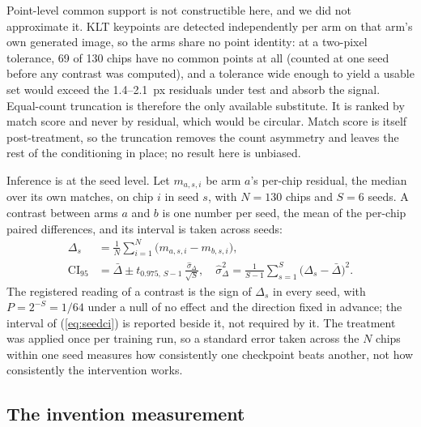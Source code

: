 Point-level common support is not constructible here, and we did not approximate it. KLT keypoints are detected independently per arm on that arm's own
generated image, so the arms share no point identity: at a two-pixel tolerance, 69 of 130
chips have no common points at all (counted at one seed before any contrast was computed), and a tolerance wide enough to yield a usable set would
exceed the 1.4--2.1~px residuals under test and absorb the signal. Equal-count truncation
is therefore the only available substitute. It is ranked by match score and never by residual, which would be circular. Match score is
itself post-treatment, so the truncation removes the count asymmetry and leaves the rest of
the conditioning in place; no result here is unbiased.

Inference is at the seed level. Let $m_{a,s,i}$ be arm $a$'s per-chip residual, the
median over its own matches, on chip $i$ in seed $s$, with $N = 130$ chips and $S = 6$
seeds. A contrast between arms $a$ and $b$ is one number per seed, the mean of the
per-chip paired differences, and its interval is taken across seeds:
\begin{subequations}\label{eq:seed}
\begin{align}
\Delta_s &= \frac{1}{N}\sum_{i=1}^{N}\bigl(m_{a,s,i} - m_{b,s,i}\bigr), \label{eq:seedstat}\\
\mathrm{CI}_{95} &= \bar{\Delta} \pm t_{0.975,\,S-1}\,\frac{\hat{\sigma}_\Delta}{\sqrt{S}},
\quad \hat{\sigma}_\Delta^2 = \frac{1}{S-1}\sum_{s=1}^{S}\bigl(\Delta_s - \bar{\Delta}\bigr)^2. \label{eq:seedci}
\end{align}
\end{subequations}
The registered reading of a contrast is the sign of $\Delta_s$ in every seed, with
$P = 2^{-S} = 1/64$ under a null of no effect and the direction fixed in advance; the
interval of (\ref{eq:seedci}) is reported beside it, not required by it. The treatment was
applied once per training run, so a standard error taken across the $N$ chips within one
seed measures how consistently one checkpoint beats another, not how consistently the
intervention works.

\subsection{The invention measurement}

